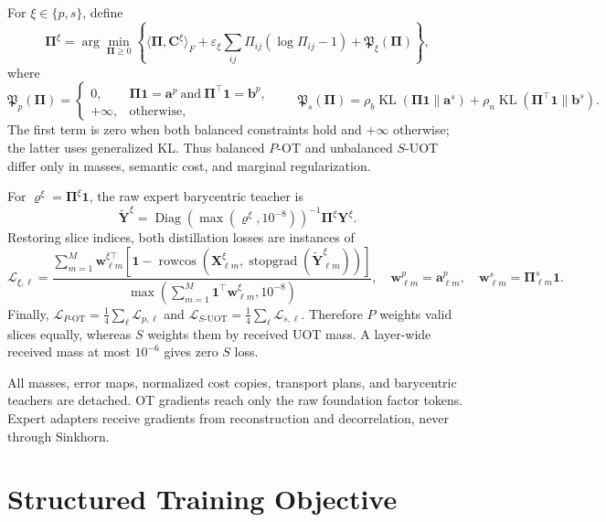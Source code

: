 \documentclass[10pt]{article}
\newcommand{\cL}{\mathcal{L}}
\newcommand{\ones}{\bm{1}}
\newcommand{\diag}{\operatorname{Diag}}
\newcommand{\KL}{\operatorname{KL}}
\newcommand{\stopgrad}{\operatorname{stopgrad}}
\newcommand{\rowcos}{\operatorname{rowcos}}
\begin{document}
For $\xi\in\{p,s\}$, define
\begin{equation}
\boxed{
 \bm\Pi^\xi
 =\arg\min_{\bm\Pi\geq0}
 \left\{
 \langle\bm\Pi,\bm C^\xi\rangle_F
 +\varepsilon_\xi\sum_{ij}\Pi_{ij}(\log\Pi_{ij}-1)
 +\mathfrak P_\xi(\bm\Pi)
 \right\},}
\label{eq:unified-transport}
\end{equation}
where
\[
 \mathfrak P_p(\bm\Pi)=
 \begin{cases}
  0,&\bm\Pi\ones=\bm a^p\ \text{and}\
     \bm\Pi^\top\ones=\bm b^p,\\
  +\infty,&\text{otherwise},
 \end{cases}
 \qquad
 \mathfrak P_s(\bm\Pi)=
 \rho_b\KL(\bm\Pi\ones\|\bm a^s)
 +\rho_n\KL(\bm\Pi^\top\ones\|\bm b^s).
\]
The first term is zero when both balanced constraints hold and $+\infty$
otherwise; the latter uses generalized KL.  Thus balanced $P$-OT and
unbalanced $S$-UOT differ only in masses, semantic cost, and marginal
regularization.

For $\bm\varrho^\xi=\bm\Pi^\xi\ones$, the raw expert barycentric teacher is
\[
 \widetilde{\bm Y}^{\xi}
 =\diag(\max(\bm\varrho^\xi,10^{-8}))^{-1}
  \bm\Pi^\xi\bm Y^\xi .
\]
Restoring slice indices, both distillation losses are instances of
\begin{equation}
\boxed{
 \cL_{\xi,\ell}
 =
 \frac{\displaystyle\sum_{m=1}^{M}
  \bm w_{\ell m}^{\xi\top}
  \left[\ones-
  \rowcos(\bm X_{\ell m}^\xi,
  \stopgrad(\widetilde{\bm Y}_{\ell m}^\xi))\right]}
 {\displaystyle\max\!\left(
  \sum_{m=1}^{M}\ones^\top\bm w_{\ell m}^\xi,10^{-8}\right)},
 \quad
 \bm w_{\ell m}^p=\bm a_{\ell m}^p,\quad
 \bm w_{\ell m}^s=\bm\Pi_{\ell m}^s\ones .}
\label{eq:transport-distillation}
\end{equation}
Finally,
$\cL_{P\text{-OT}}=\frac14\sum_{\ell}\cL_{p,\ell}$ and
$\cL_{S\text{-UOT}}=\frac14\sum_{\ell}\cL_{s,\ell}$.  Therefore $P$ weights
valid slices equally, whereas $S$ weights them by received UOT mass.  A
layer-wide received mass at most $10^{-6}$ gives zero $S$ loss.

All masses, error maps, normalized cost copies, transport plans, and
barycentric teachers are detached.  OT gradients reach only the raw
foundation factor tokens.  Expert adapters receive gradients from
reconstruction and decorrelation, never through Sinkhorn.

\section{Structured Training Objective}
\end{document}
